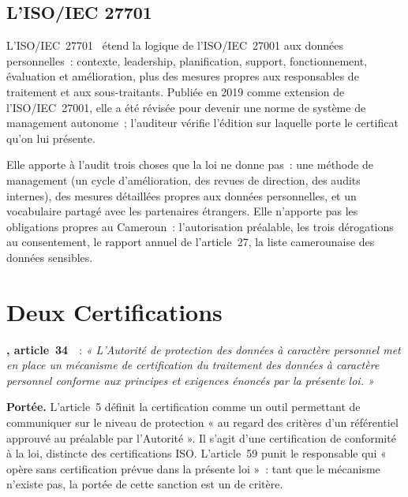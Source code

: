 \subsection{L'ISO/IEC 27701}

L'ISO/IEC~27701~\cite{iso27701} étend la logique de l'ISO/IEC~27001 aux
données personnelles~: contexte, leadership, planification, support,
fonctionnement, évaluation et amélioration, plus des mesures propres aux
responsables de traitement et aux sous-traitants. Publiée en 2019 comme
extension de l'ISO/IEC~27001, elle a été révisée pour devenir une norme de
système de management autonome~; l'auditeur vérifie l'édition sur laquelle
porte le certificat qu'on lui présente.

Elle apporte à l'audit trois choses que la loi ne donne pas~: une méthode
de management (un cycle d'amélioration, des revues de direction, des
audits internes), des mesures détaillées propres aux données personnelles,
et un vocabulaire partagé avec les partenaires étrangers. Elle n'apporte
pas les obligations propres au Cameroun~: l'autorisation préalable, les
trois dérogations au consentement, le rapport annuel de l'article~27, la
liste camerounaise des données sensibles.

\section{Deux Certifications}
\label{sec:c09-certification}

\begin{boxjuris}
\textbf{, article~34}~\cite{loi2024017}~:
\textit{« L'Autorité de protection des données à caractère personnel met en
place un mécanisme de certification du traitement des données à caractère
personnel conforme aux principes et exigences énoncés par la présente
loi. »}

\smallskip
\textbf{Portée.} L'article~5 définit la certification comme un outil
permettant de communiquer sur le niveau de protection « au regard des
critères d'un référentiel approuvé au préalable par l'Autorité ». Il s'agit
d'une certification de conformité à la loi, distincte des certifications
ISO. L'article~59 punit le responsable qui « opère sans certification
prévue dans la présente loi »~: tant que le mécanisme n'existe pas, la
portée de cette sanction est un \NEK{} de critère.
\end{boxjuris}

